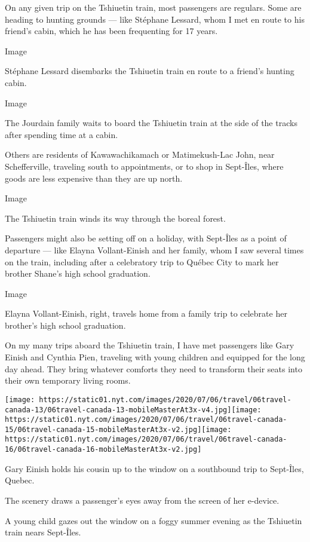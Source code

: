 On any given trip on the Tshiuetin train, most passengers are regulars.
Some are heading to hunting grounds --- like Stéphane Lessard, whom I
met en route to his friend's cabin, which he has been frequenting for 17
years.

Image

Stéphane Lessard disembarks the Tshiuetin train en route to a friend's
hunting cabin.

Image

The Jourdain family waits to board the Tshiuetin train at the side of
the tracks after spending time at a cabin.

Others are residents of Kawawachikamach or Matimekush-Lac John, near
Schefferville, traveling south to appointments, or to shop in Sept-Îles,
where goods are less expensive than they are up north.

Image

The Tshiuetin train winds its way through the boreal forest.

Passengers might also be setting off on a holiday, with Sept-Îles as a
point of departure --- like Elayna Vollant-Einish and her family, whom I
saw several times on the train, including after a celebratory trip to
Québec City to mark her brother Shane's high school graduation.

Image

Elayna Vollant-Einish, right, travels home from a family trip to
celebrate her brother's high school graduation.

On my many trips aboard the Tshiuetin train, I have met passengers like
Gary Einish and Cynthia Pien, traveling with young children and equipped
for the long day ahead. They bring whatever comforts they need to
transform their seats into their own temporary living rooms.

\texttt{[image: https://static01.nyt.com/images/2020/07/06/travel/06travel-canada-13/06travel-canada-13-mobileMasterAt3x-v4.jpg]}\texttt{[image: https://static01.nyt.com/images/2020/07/06/travel/06travel-canada-15/06travel-canada-15-mobileMasterAt3x-v2.jpg]}\texttt{[image: https://static01.nyt.com/images/2020/07/06/travel/06travel-canada-16/06travel-canada-16-mobileMasterAt3x-v2.jpg]}

Gary Einish holds his cousin up to the window on a southbound trip to
Sept-Îles, Quebec.

The scenery draws a passenger's eyes away from the screen of her
e-device.

A young child gazes out the window on a foggy summer evening as the
Tshiuetin train nears Sept-Îles.

